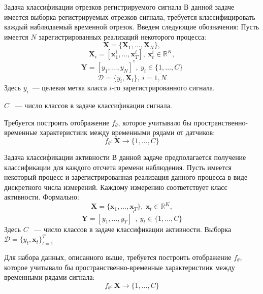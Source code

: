 \documentclass[9pt,pdf]{beamer} %
\newcommand{\T}{^{\mathsf{T}}}
\begin{document}
\begin{frame}{Задача классификации отрезков регистрируемого сигнала}
В данной задаче имеется выборка регистрируемых отрезков сигнала, 
требуется классифицировать каждый наблюдаемый временной отрезок. 
Введем следующие обозначения:
Пусть имеется $N$ зарегистрированных реализаций некоторого процесса:
$$\bm{X} = \{\bm{X}_1,\dots, \bm{X}_N\},$$
$$\bm{X}_i = \left[\bm{x}^i_1,\dots, \bm{x}^i_{T}\right], ~\bm{x}^i_t \in \mathbb{R}^K,$$
$$\bm{Y} = \left[y_1, \dots, y_{N}\right]^{\T},~y_i \in \{1,\dots, C\}$$
$$\mathcal{D} = \{y_i, \bm{X}_i\},~  i = \overline{1,N}$$
Здесь $y_i$~--- целевая метка класса $i$-го зарегистрированного сигнала.

$C$ ~--- число классов в задаче классификации сигнала. 


Требуется построить отображение $f_\theta$, которое учитывало 
бы пространственно-временные характеристиик между временными рядами от датчиков:
$$f_\theta: \bm{X} \rightarrow \{1,\dots, C\}$$

\end{frame}

\begin{frame}{Задача классификации активности} 
В данной задаче предполагается получение классификации для каждого отсчета 
времени наблюдения.
Пусть имеется некоторый процесс и зарегистрированная реализация данного 
процесса в виде дискретного числа измерений. Каждому измерению соответствует
класс активности. Формально:
$$\bm{X} = \{\bm{x}_1,\dots, \bm{x}_{T}\}, ~\bm{x}_t \in \mathbb{R}^K,$$
$$\bm{Y} = \left[y_1, \dots, y_{T}\right]^{\T},~y_t \in \{1,\dots, C\}$$
Здесь $C$ ~--- число классов в задаче классификации активности. 
Выборка $\mathcal{D} = \{y_t, \bm{x}_t\}_{t=1}^T$

Для набора данных, описанного выше, требуется построить отображение $f_\theta$, которое учитывало 
бы пространственно-временные характеристиик между временными рядами сигнала:
$$f_\theta: \bm{X} \rightarrow \{1,\dots, C\}$$ 
\end{frame}
\end{document}
